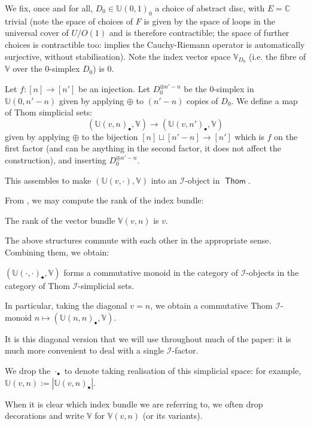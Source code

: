 \documentclass{TPmod}
\def\bC{\mathbb{C}}
\def\bU{\mathbb{U}}
\def\bV{\mathbb{V}}
\DeclareMathOperator{\Thom}{\mathsf{Thom}}
\newcommand{\cI}{\mathcal{I}}
\numberwithin{equation}{section}
\begin{document}
    \begin{defn}\label{def: stab abst disc}
        We fix, once and for all, $D_0 \in  \bU(0,1)_0$ a choice of abstract disc, with $E = \bC$ trivial (note the space of choices of $F$ is given by the space of loops in the universal cover of $U/O(1)$ and is therefore contractible; the space of further choices is contractible too: \cite[Theorem C.1.10]{McDuff-Salamon} implies the Cauchy-Riemann operator is automatically surjective, without stabilisation). Note the index vector space $\bV_{D_0}$ (i.e. the fibre of $\bV$ over the 0-simplex $D_0$) is 0.

        Let $f: [n] \to [n']$ be an injection. Let $D_0^{\oplus n'-n}$ be the 0-simplex in $\bU(0,n'-n)$ given by applying $\oplus$ to $(n'-n)$ copies of $D_0$. We define a map of Thom simplicial sets:
        \begin{equation}
            \left(\bU(v,n)_\bullet, \bV\right) \to \left(\bU(v,n')_\bullet, \bV\right)
        \end{equation}
        given by applying $\oplus$ to the bijection $[n] \sqcup [n'-n] \to [n']$ which is $f$ on the first factor (and can be anything in the second factor, it does not affect the construction), and inserting $D_0^{\oplus n'-n}$.

        This assembles to make $(\bU(v, \cdot), \bV)$ into an $\cI$-object in $\Thom$.
    \end{defn}
    From \cite[Proposition 11.13]{Seidel:book}, we may compute the rank of the index bundle:
    \begin{lem} \label{lem:rank of index bundle}
        The rank of the vector bundle $\bV(v,n)$ is $v$.
    \end{lem}
    The above structures commute with each other in the appropriate sense. Combining them, we obtain:
    \begin{prop} \label{prop: wrifjeogiejoigv}
        $\left(\bU(\cdot, \cdot)_\bullet, \bV\right)$ forms a commutative monoid in the category of $\cI$-objects in the category of Thom $\cI$-simplicial sets.

        In particular, taking the diagonal $v=n$, we obtain a commutative Thom $\cI$-monoid $n \mapsto \left(\bU(n,n)_\bullet, \bV\right)$.
    \end{prop}
    It is this diagonal version that we will use throughout much of the paper: it is much more convenient to deal with a single $\cI$-factor.
    \begin{Not}
        We drop the $\cdot_\bullet$ to denote taking realisation of this simplicial space: for example, $\bU(v,n) := |\bU(v,n)_\bullet|$. 
        
        When it is clear which index bundle we are referring to, we often drop decorations and write $\bV$ for $\bV(v,n)$ (or its variants).
    \end{Not}
\end{document}
